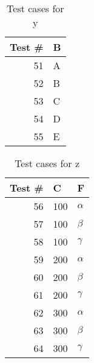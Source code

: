 \documentclass[12pt, letterpaper, titlepage]{article}
\begin{document}
    \begin{table}[H]
        \centering
        \caption{Test cases for y}
        \begin{tabular}{|r|l|}
        \hline
        \multicolumn{1}{|l|}{Test \#} & B \\ \hline
        51                            & A \\ \hline
        52                            & B \\ \hline
        53                            & C \\ \hline
        54                            & D \\ \hline
        55                            & E \\ \hline
        \end{tabular}
    \end{table}
    
    \begin{table}[H]
        \centering
        \caption{Test cases for z}
        \begin{tabular}{|r|r|l|}
        \hline
        \multicolumn{1}{|l|}{Test \#} & \multicolumn{1}{l|}{C} & F                     \\ \hline
        56                            & 100                    & $\alpha$ \\ \hline
        57                            & 100                    & $\beta$  \\ \hline
        58                            & 100                    & $\gamma$ \\ \hline
        59                            & 200                    & $\alpha$ \\ \hline
        60                            & 200                    & $\beta$  \\ \hline
        61                            & 200                    & $\gamma$ \\ \hline
        62                            & 300                    & $\alpha$ \\ \hline
        63                            & 300                    & $\beta$  \\ \hline
        64                            & 300                    & $\gamma$ \\ \hline
        \end{tabular}
        \end{table}
\end{document}
